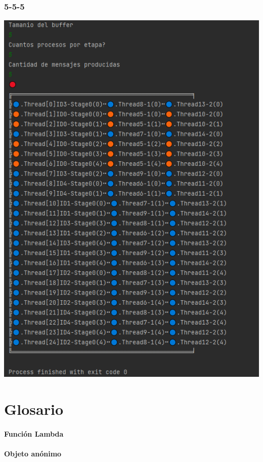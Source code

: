 \documentclass[a4paper]{article}
\begin{document}
\subsubsection{5-5-5}
\includegraphics{5-5-5.PNG}

\section{Glosario}
\paragraph{Función Lambda}

\paragraph{Objeto anónimo}


\end{document}
